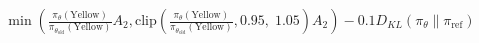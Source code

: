 \documentclass[preview]{standalone}
\begin{document}
\begin{align*}
\min \left(\frac{\pi_\theta(\text{Yellow})}{\pi_{\theta_{\text{old}}}(\text{Yellow})} A_2, \text{clip} \left( \frac{\pi_\theta(\text{Yellow})}{\pi_{\theta_{\text{old}}}(\text{Yellow})}, 0.95,\; 1.05 \right) A_2 \right) - 0.1 D_{KL}(\pi_\theta \parallel \pi_{\text{ref}})
\end{align*}
\end{document}
